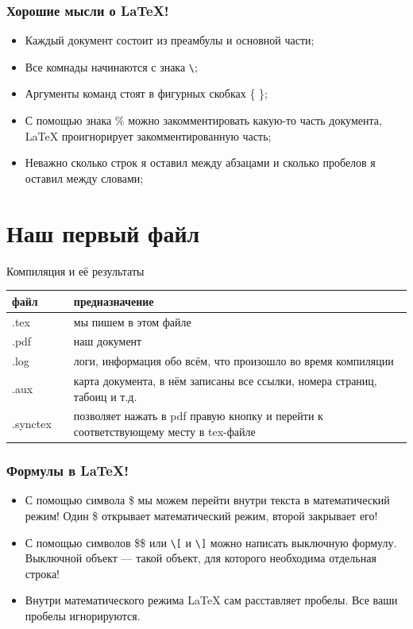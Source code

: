 \documentclass[newPxFont]{beamer}
\begin{document}
\begin{frame}[fragile]
\frametitle{Хорошие мысли о \LaTeX!} 
\begin{itemize}
\item Каждый документ состоит из преамбулы и основной части;
\item Все \alert{комнады} начинаются с знака \verb|\|;
\item Аргументы команд стоят в фигурных скобках \{ \};
\item С помощью знака \% можно закомментировать какую-то часть документа, \LaTeX{} проигнорирует закомментированную часть;
\item Неважно сколько строк я оставил между абзацами и сколько пробелов я оставил между словами; 
\end{itemize}
\end{frame}

\section{Наш первый файл}

\begin{frame}{Компиляция и её результаты}

\centering 
	\begin{tabulary}{\linewidth}{JcJ}
		\toprule
		  файл	  & & предназначение \\[0.25em]
		\midrule
		  .tex    & & мы пишем в этом файле  \\[0.25em]
		  .pdf    & & наш документ  \\[0.25em]
		  .log    & & логи, информация обо всём, что произошло во время компиляции  \\[0.25em]
		  .aux    & & карта документа, в нём записаны все ссылки, номера страниц, табоиц и т.д.  \\[0.25em]
          .synctex     & & позволяет нажать в pdf правую кнопку и перейти к соответствующему месту в tex-файле  \\[0.25em]
		\bottomrule
	\end{tabulary}
\end{frame}

\begin{frame}[fragile]
\frametitle{Формулы в \LaTeX!} 
\begin{itemize}
\item С помощью символа \$ мы можем перейти внутри текста в математический режим! Один \$ открывает математический режим, второй закрывает его!  \pause
\item С помощью символов \$\$ или \verb|\[| и \verb|\]| можно написать выключную формулу. Выключной объект --- такой объект, для которого необходима отдельная строка! \pause
\item Внутри математического режима \LaTeX{} сам расставляет пробелы. Все ваши пробелы игнорируются.
\end{itemize}
\end{frame}
\end{document}
